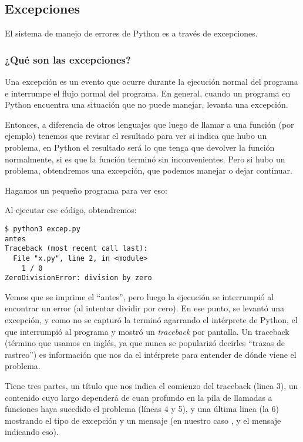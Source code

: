 \subsection{Excepciones}\label{sub:excepciones}

El sistema de manejo de errores de Python es a través de excepciones. 

\subsubsection{¿Qué son las excepciones?}

Una excepción es un evento que ocurre durante la ejecución normal del programa e interrumpe el flujo normal del programa. En general, cuando un programa en Python encuentra una situación que no puede manejar, levanta una excepción.

Entonces, a diferencia de otros lenguajes que luego de llamar a una función (por ejemplo) tenemos que revisar el resultado para ver si indica que hubo un problema, en Python el resultado será lo que tenga que devolver la función normalmente, si es que la función terminó sin inconvenientes. Pero si hubo un problema, obtendremos una excepción, que podemos manejar o dejar continuar.

Hagamos un pequeño programa para ver eso:


Al ejecutar ese código, obtendremos:

\begin{verbatim}
$ python3 excep.py 
antes
Traceback (most recent call last):
  File "x.py", line 2, in <module>
    1 / 0
ZeroDivisionError: division by zero
\end{verbatim}

Vemos que se imprime el ``antes'', pero luego la ejecución se interrumpió al encontrar un error (al intentar dividir por cero). En ese punto, se levantó una excepción, y como no se capturó la terminó agarrando el intérprete de Python, el que interrumpió al programa y mostró un \textit{traceback} por pantalla. Un traceback (término que usamos en inglés, ya que nunca se popularizó decirles ``trazas de rastreo'') es información que nos da el intérprete para entender de dónde viene el problema.

Tiene tres partes, un título que nos indica el comienzo del traceback (linea 3), un contenido cuyo largo dependerá de cuan profundo en la pila de llamadas a funciones haya sucedido el problema (líneas 4 y 5), y una última linea (la 6) mostrando el tipo de excepción y un mensaje (en nuestro caso , y el mensaje indicando eso).

